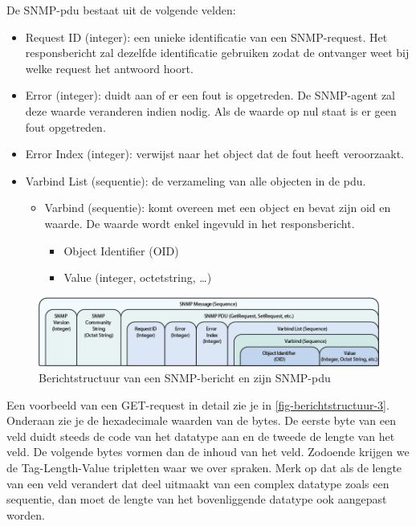 De SNMP-\gls{pdu} bestaat uit de volgende velden:

\begin{itemize}
	\item Request ID (integer): een unieke identificatie van een SNMP-request.
		Het responsbericht zal dezelfde identificatie gebruiken zodat de ontvanger weet bij welke request het antwoord hoort.
	\item Error (integer): duidt aan of er een fout is opgetreden.
		De SNMP-agent zal deze waarde veranderen indien nodig. Als de waarde op nul staat is er geen fout opgetreden.
	\item Error Index (integer): verwijst naar het object dat de fout heeft veroorzaakt.
	\item Varbind List (sequentie): de verzameling van alle objecten in de \gls{pdu}.
		\begin{itemize}
			\item Varbind (sequentie): komt overeen met een object en bevat zijn \gls{oid} en waarde.
				De waarde wordt enkel ingevuld in het responsbericht.
				\begin{itemize}
					\item Object Identifier (OID)
					\item Value (integer, octetstring, \ldots)
				\end{itemize}
		\end{itemize}
\end{itemize}

\begin{figure}[h]
	\centering
	\includegraphics[scale=0.45]{figures/snmp/berichtstructuur-2}
	\caption[Berichtstructuur van een SNMP-bericht en zijn SNMP-PDU]{Berichtstructuur van een SNMP-bericht en zijn SNMP-\gls{pdu}\cite{snmp-message-format}}
	\label{fig-berichtstructuur-2}
\end{figure}

Een voorbeeld van een GET-request in detail zie je in \cref{fig-berichtstructuur-3}.
Onderaan zie je de hexadecimale waarden van de bytes.
De eerste byte van een veld duidt steeds de code van het datatype aan en de tweede de lengte van het veld.
De volgende bytes vormen dan de inhoud van het veld.
Zodoende krijgen we de Tag-Length-Value tripletten waar we over spraken.
Merk op dat als de lengte van een veld verandert dat deel uitmaakt van een complex datatype zoals een sequentie,
dan moet de lengte van het bovenliggende datatype ook aangepast worden.

